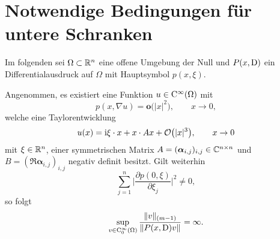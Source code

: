 \section{Notwendige Bedingungen für untere Schranken}
Im folgenden sei $\Omega \subset \mathbb R^n$ eine offene Umgebung der Null und $P(x,\mathrm D)$ ein Differentialausdruck auf $\Omega$ mit Hauptsymbol $p(x,\xi)$. 
\begin{lem}\label{lem1}
Angenommen, es existiert eine Funktion $u \in \mathrm C^\infty (\Omega)$ mit 
\begin{equation}
\label{grad}
p(x, \nabla u) = \mathbf{o} \big(|x|^2\big), \qquad  x \rightarrow 0,
\end{equation}
welche eine Taylorentwicklung 
\begin{equation}\label{taylor}
u(x) = \mathrm i \xi\cdot x + x\cdot A x + \mathcal O\big(|x|^3\big),\qquad x\to0
\end{equation}
mit $\xi\in\mathbb R^n$, einer symmetrischen Matrix $A=(\boldsymbol\alpha_{i,j})_{i,j}\in\mathbb C^{n\times n}$ und $B = (\Re \boldsymbol\alpha_{i,j})_{i,j} $ negativ definit  besitzt. 
Gilt weiterhin  
\begin{equation}
\label{normpart}
\sum_{j=1}^{n}\bigg|\frac{\partial p(0,\xi)}{\partial \xi_j}\bigg|^2 \neq 0,
\end{equation}
so folgt
\begin{equation}
\label{lm 1 eq}
\sup_{v\in\mathrm C_0^\infty(\Omega)} \frac{ \lVert v \rVert_{(m-1)} }{ \lVert P(x,\mathrm D)v \rVert} = \infty.
\end{equation}
\end{lem}
